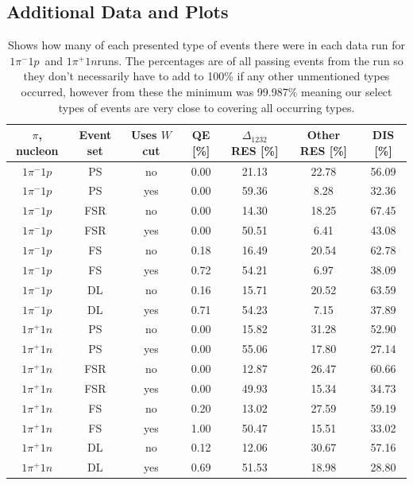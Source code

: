 \documentclass[a4paper,12pt]{article}
\newcommand{\md}{$1\pi^-1p$}
\newcommand{\pd}{$1\pi^+1n$}
\begin{document}
\begin{appendices}
    \section{Additional Data and Plots}\label{app:extra}
    \begin{table}[H]
        \begin{center}
            \begin{tabular}{ c | c | c | c | c | c | c }
                $\pi$, nucleon & Event set & Uses $W$ cut & QE [\%] & $\Delta_{1232}$ RES [\%] & Other RES [\%] & DIS [\%] \\
                \hline
                $1\pi^-1p$ & PS & no & 0.00 & 21.13 & 22.78 & 56.09 \\
                $1\pi^-1p$ & PS & yes & 0.00 & 59.36 & 8.28 & 32.36 \\
                $1\pi^-1p$ & FSR & no & 0.00 & 14.30 & 18.25 & 67.45 \\
                $1\pi^-1p$ & FSR & yes & 0.00 & 50.51 & 6.41 & 43.08 \\
                $1\pi^-1p$ & FS & no & 0.18 & 16.49 & 20.54 & 62.78 \\
                $1\pi^-1p$ & FS & yes & 0.72 & 54.21 & 6.97 & 38.09 \\
                $1\pi^-1p$ & DL & no & 0.16 & 15.71 & 20.52 & 63.59 \\
                $1\pi^-1p$ & DL & yes & 0.71 & 54.23 & 7.15 & 37.89 \\
                $1\pi^+1n$ & PS & no & 0.00 & 15.82 & 31.28 & 52.90 \\
                $1\pi^+1n$ & PS & yes & 0.00 & 55.06 & 17.80 & 27.14 \\
                $1\pi^+1n$ & FSR & no & 0.00 & 12.87 & 26.47 & 60.66 \\
                $1\pi^+1n$ & FSR & yes & 0.00 & 49.93 & 15.34 & 34.73 \\
                $1\pi^+1n$ & FS & no & 0.20 & 13.02 & 27.59 & 59.19 \\
                $1\pi^+1n$ & FS & yes & 1.00 & 50.47 & 15.51 & 33.02 \\
                $1\pi^+1n$ & DL & no & 0.12 & 12.06 & 30.67 & 57.16 \\
                $1\pi^+1n$ & DL & yes & 0.69 & 51.53 & 18.98 & 28.80
            \end{tabular}
        \end{center}
        \caption{
            Shows how many of each presented type of events there were in each data run for \md\ and \pd runs.
            The percentages are of all passing events from the run so they don't necessarily have to add to 100\% if any other unmentioned types occurred, however from these the minimum was 99.987\% meaning our select types of events are very close to covering all occurring types.
        }\label{fig:extra1}
    \end{table}


\end{appendices}
\end{document}
